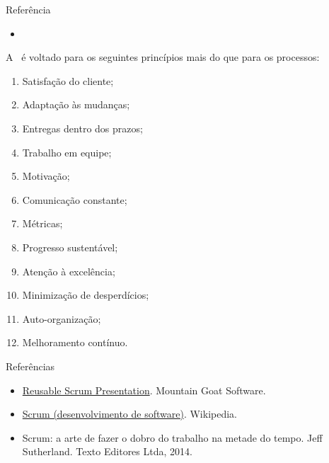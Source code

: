 \begin{frame}{Referência}
  \begin{itemize}
  \item \agileboxref
  \end{itemize}
\end{frame}

\begin{frame}{\insertlecture}
  A \insertlecture\ é voltado para os seguintes princípios mais do que
  para os processos:
  
  \footnotesize
  \begin{enumerate}[<+-| alert@+>]
  \item Satisfação do cliente;
  \item Adaptação às mudanças;
  \item Entregas dentro dos prazos;
  \item Trabalho em equipe;
  \item Motivação;
  \item Comunicação constante;
  \item Métricas;
  \item Progresso sustentável;
  \item Atenção à excelência;
  \item Minimização de desperdícios;
  \item Auto-organização;
  \item Melhoramento contínuo.
  \end{enumerate}
\end{frame}



\lecturetitle{\insertlecture}{\course}
\frame{\maketitle}

\begin{frame}{Referências}
  \begin{itemize}
  \item \href{http://www.mountaingoatsoftware.com/agile/scrum/a-reusable-scrum-presentation}{Reusable Scrum Presentation}. Mountain Goat Software.
  \item
    \href{https://pt.wikipedia.org/wiki/Scrum_(desenvolvimento_de_software)}{Scrum
      (desenvolvimento de software)}. Wikipedia.
  \item Scrum: a arte de fazer o dobro do trabalho na metade do
    tempo. Jeff Sutherland. Texto Editores Ltda, 2014.
  \end{itemize}  
\end{frame}

